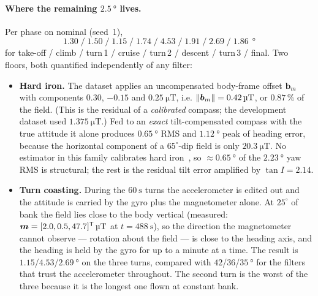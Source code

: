 \paragraph{Where the remaining $\SI{2.5}{\degree}$ lives.} Per phase on nominal (seed~1),
\[
1.30\;/\;1.50\;/\;1.15\;/\;1.74\;/\;4.53\;/\;1.91\;/\;2.69\;/\;1.86\ \SI{}{\degree}
\]
for take-off / climb / turn\,1 / cruise / turn\,2 / descent / turn\,3 / final. Two floors, both
quantified independently of any filter:
\begin{itemize}[nosep]
\item \textbf{Hard iron.} The dataset applies an uncompensated body-frame offset
$\bm{b}_m$ with components $0.30$, $-0.15$ and $\SI{0.25}{\micro\tesla}$, i.e.
$\left\lVert \bm{b}_m \right\rVert=\SI{0.42}{\micro\tesla}$, or $0.87\,\%$ of the field. (This is the residual of a
\emph{calibrated} compass; the development dataset used $\SI{1.375}{\micro\tesla}$.) Fed to an
\emph{exact} tilt-compensated
compass with the true attitude it alone produces $\SI{0.65}{\degree}$ RMS and $\SI{1.12}{\degree}$
peak of heading error, because the horizontal component of a $65^\circ$-dip field is only
$\SI{20.3}{\micro\tesla}$. No estimator in this family calibrates hard iron~\cite{gebreegziabher2006},
so $\approx\SI{0.65}{\degree}$ of the $\SI{2.23}{\degree}$ yaw RMS is structural; the rest is the
residual tilt error amplified by $\tan I=2.14$.
\item \textbf{Turn coasting.} During the $\SI{60}{\second}$ turns the accelerometer is edited out
and the attitude is carried by the gyro plus the magnetometer alone. At $25^\circ$ of bank the field
lies close to the body vertical (measured: $\bm{m}=[2.0,0.5,47.7]^{\mathsf{T}}\,\SI{}{\micro\tesla}$ at
$t=\SI{488}{\second}$), so the direction the magnetometer cannot observe --- rotation about the
field --- is close to the heading axis, and the heading is held by the gyro for up to a minute at a
time. The result is $1.15$/$4.53$/$\SI{2.69}{\degree}$ on the three turns, compared with
$42$/$36$/$\SI{35}{\degree}$ for the filters that trust the accelerometer throughout. The second
turn is the worst of the three because it is the longest one flown at constant bank.
\end{itemize}

